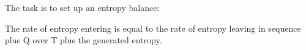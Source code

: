 The task is to set up an entropy balance:

The rate of entropy entering is equal to the rate of entropy leaving in sequence plus Q over T plus the generated entropy.
